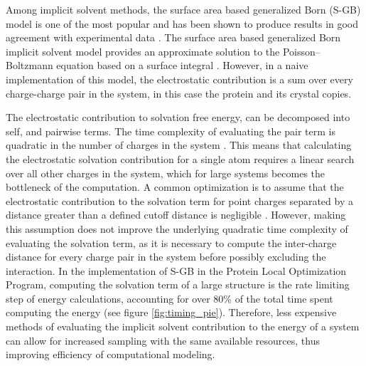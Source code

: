 Among implicit solvent methods, the surface area based generalized Born (S-GB) model is one of the most popular and has been shown to produce results in good agreement with experimental data \cite{zhang2001solvent,gallicchio2002sgb}.
The surface area based generalized Born implicit solvent model provides an approximate solution to the Poisson--Boltzmann equation based on a surface integral \cite{ghosh1998generalized}.
However, in a naive implementation of this model, the electrostatic contribution is a sum over every charge-charge pair in the system, in this case the protein and its crystal copies.

The electrostatic contribution to solvation free energy, can be decomposed into self, and pairwise terms.
The time complexity of evaluating the pair term is quadratic in the number of charges in the system \cite{ghosh1998generalized}.
This means that calculating the electrostatic solvation contribution for a single atom requires a linear search over all other charges in the system, which for large systems becomes the bottleneck of the computation.
A common optimization is to assume that the electrostatic contribution to the solvation term for point charges separated by a distance greater than a defined cutoff distance is negligible \cite{gallicchio2004agbnp}. 
However, making this assumption does not improve the underlying quadratic time complexity of evaluating the solvation term, as it is necessary to compute the inter-charge distance for every charge pair in the system before possibly excluding the interaction.
In the implementation of S-GB in the Protein Local Optimization Program, computing the solvation term of a large structure is the rate limiting step of energy calculations, accounting for over 80\% of the total time spent computing the energy (see figure \ref{fig:timing_pie}).
Therefore, less expensive methods of evaluating the implicit solvent contribution to the energy of a system can allow for increased sampling with the same available resources, thus improving efficiency of computational modeling. 


